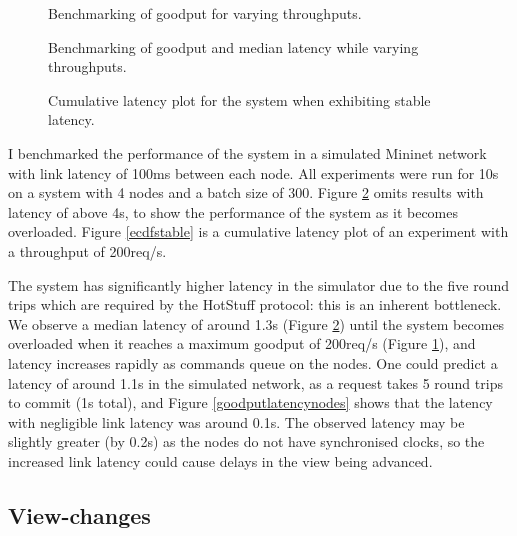 \begin{figure}[h!]
\centering
\resizebox{.6\textwidth}{!}{}
\caption{Benchmarking of goodput for varying throughputs.}
\label{throughoutgoodputmininet}
\end{figure}

\begin{figure}[h!]
\centering
\resizebox{.5\textwidth}{!}{}
\caption{Benchmarking of goodput and median latency while varying throughputs.}
\label{goodputlatencymininet}
\end{figure}

\begin{figure}[h!]
\centering
\resizebox{.6\textwidth}{!}{}
\caption{Cumulative latency plot for the system when exhibiting stable latency.}
\label{ecdfmininet}
\end{figure}

I benchmarked the performance of the system in a simulated Mininet network \cite{mininet,lantzNetworkLaptopRapid2010} with link latency of 100ms between each node. All experiments were run for 10s on a system with 4 nodes and a batch size of 300. Figure \ref{goodputlatencymininet} omits results with latency of above 4s, to show the performance of the system as it becomes overloaded. Figure \ref{ecdfstable} is a cumulative latency plot of an experiment with a throughput of 200req/s.

The system has significantly higher latency in the simulator due to the five round trips which are required by the HotStuff protocol: this is an inherent bottleneck. We observe a median latency of around 1.3s (Figure \ref{goodputlatencymininet}) until the system becomes overloaded when it reaches a maximum goodput of 200req/s (Figure \ref{throughoutgoodputmininet}), and latency increases rapidly as commands queue on the nodes. One could predict a latency of around 1.1s in the simulated network, as a request takes 5 round trips to commit (1s total), and Figure \ref{goodputlatencynodes} shows that the latency with negligible link latency was around 0.1s. The observed latency may be slightly greater (by 0.2s) as the nodes do not have synchronised clocks, so the increased link latency could cause delays in the view being advanced.

\subsection{View-changes} \label{viewchangeeval}


